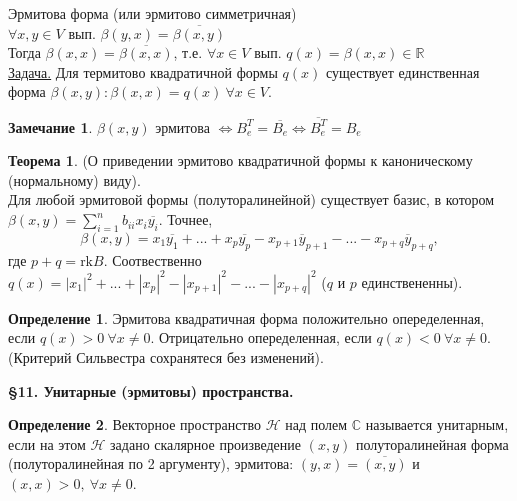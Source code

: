 \documentclass[a4paper, 12pt]{article}
\theoremstyle{definition}
\newtheorem*{definition}{Определение}
\newtheorem*{theorem}{Теорема}
\newtheorem*{remark}{Замечание}
\begin{document}
    Эрмитова форма (или эрмитово симметричная)\\
    $\forall x,y \in V$ вып. $\beta(y,x) = \overline{\beta
    (x,y)}$\\
    Тогда $\beta(x,x) = \overline{\beta(x,x)}$, т.е. 
    $\forall x\in V$ вып. $q(x) = \beta(x,x) \in \mathbb{R}$\\
    \underline{Задача.} Для термитово квадратичной формы 
    $q(x)$ существует единственная форма $\beta(x,y):
    \beta(x,x) = q(x)\ \forall x \in V$. 
    \begin{remark}
        $\beta(x,y)$ эрмитова $\Longleftrightarrow B_e^T = 
        \overline{B_e} \Longleftrightarrow \overline{B_e^T}
        = B_e$   
    \end{remark}
    \begin{theorem}
        (О приведении эрмитово квадратичной формы к
        каноническому\\ (нормальному) виду).\\
        Для любой эрмитовой формы (полуторалинейной)
        существует базис, в котором $\beta(x,y) = \sum\limits_
        {i=1}^{n} b_{ii} x_i\overline{y_i}$. Точнее,
        $$\beta(x,y) = x_1\overline{y_1} + ... + 
        x_p\overline{y_p} - x_{p+1}\overline{y}_{p+1} -...-
        x_{p+q}\overline{y}_{p+q},$$ где $p+q = \text{rk}B$.
        Соотвественно $q(x) = |x_1|^2 +...+ |x_p|^2 - |x_{p+1}|
        ^2 -...- |x_{p+q}|^2$ ($q$ и $p$ единствененны).
    \end{theorem}
    \begin{definition}
        Эрмитова квадратичная форма положительно опеределенная,
        если $q(x) > 0\ \forall x \neq 0$. Отрицательно 
        опеределенная, если $q(x) < 0\ \forall x\neq 0$.\\
        (Критерий Сильвестра сохранятеся без изменений).
    \end{definition}
    \begin{center}
        \begin{Large}
            \textbf{\S11. Унитарные (эрмитовы) пространства.}
        \end{Large}
    \end{center}
    \begin{definition}
        Векторное пространство $\mathcal{H}$ над полем $\mathbb
        {C}$ называется унитарным, если на этом $\mathcal{H}$
        задано скалярное произведение $(x,y)$ 
        полуторалинейная форма (полуторалинейная по 2 
        аргументу), эрмитова: $(y,x) = \overline{(x,y)}$ и 
        $(x,x) > 0,\ \forall x \neq 0$. 
    \end{definition}
\end{document}
